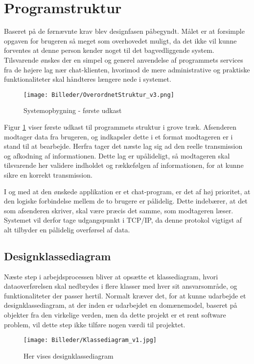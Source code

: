 \section{Programstruktur}
Baseret på de førnævnte krav blev designfasen påbegyndt. Målet er at forsimple opgaven for brugeren så meget som overhovedet muligt, da det ikke vil kunne forventes at denne person kender noget til det bagvedliggende system.
Tilsvarende ønskes der en simpel og generel anvendelse af programmets services fra de højere lag nær chat-klienten, hvorimod de mere administrative og praktiske funktionaliteter skal håndteres længere nede i systemet.

\begin{figure}[h!]
\centering
\texttt{[image: Billeder/OverordnetStruktur\_v3.png]}
\caption{Systemopbygning - første udkast}
\label{fig:Blokdiagram}
\end{figure}

Figur \ref{fig:Blokdiagram} viser første udkast til programmets struktur i grove træk. Afsenderen modtager data fra brugeren, og indkapsler dette i et format modtageren er i stand til at bearbejde. Herfra tager det næste lag sig ad den reelle transmission og afkodning af informationen. Dette lag er upålideligt, så modtageren skal tilsvarende her validere indholdet og rækkefølgen af informationen, for at kunne sikre en korrekt transmission.

I og med at den ønskede applikation er et chat-program, er det af høj prioritet, at den logiske forbindelse mellem de to brugere er pålidelig. Dette indebærer, at det som afsenderen skriver, skal være præcis det samme, som modtageren læser. Systemet vil derfor tage udgangspunkt i TCP/IP, da denne protokol vigtigst af alt tilbyder en pålidelig overførsel af data. 


\subsection{Designklassediagram}
Næste step i arbejdsprocessen bliver at opsætte et klassediagram, hvori dataoverførelsen skal nedbrydes i flere klasser med hver sit ansvarsområde, og funktionaliteter der passer hertil. Normalt kræver det, for at kunne udarbejde et designklassediagram, at der inden er udarbejdet en domænemodel, baseret på objekter fra den virkelige verden, men da dette projekt er et rent software problem, vil dette step ikke tilføre nogen værdi til projektet. 

\begin{figure}[h]
\centering
\texttt{[image: Billeder/Klassediagram\_v1.jpg]}
\caption{Her vises designklassediagram}
\label{fig:Klassediagram_v1}
\end{figure}

